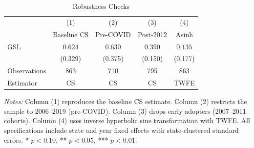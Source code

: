 \begin{table}[H]
\centering
\caption{Robustness Checks}
\begin{threeparttable}
\begin{tabular}{lcccc}
\toprule
 & (1) & (2) & (3) & (4) \\
 & Baseline CS & Pre-COVID & Post-2012 & Asinh \\
\midrule
GSL & $0.624$ & $0.630$ & $0.390$ & $0.135$ \\
 & (0.329) & (0.375) & (0.150) & (0.177) \\
\midrule
Observations & 863 & 710 & 795 & 863 \\
Estimator & CS & CS & CS & TWFE \\
\bottomrule
\end{tabular}
\begin{tablenotes}[flushleft]
\small
\item \textit{Notes:} Column (1) reproduces the baseline CS estimate. Column (2) restricts the sample to 2006--2019 (pre-COVID). Column (3) drops early adopters (2007--2011 cohorts). Column (4) uses inverse hyperbolic sine transformation with TWFE. All specifications include state and year fixed effects with state-clustered standard errors. * $p<0.10$, ** $p<0.05$, *** $p<0.01$.
\end{tablenotes}
\end{threeparttable}
\label{tab:robust}
\end{table}

